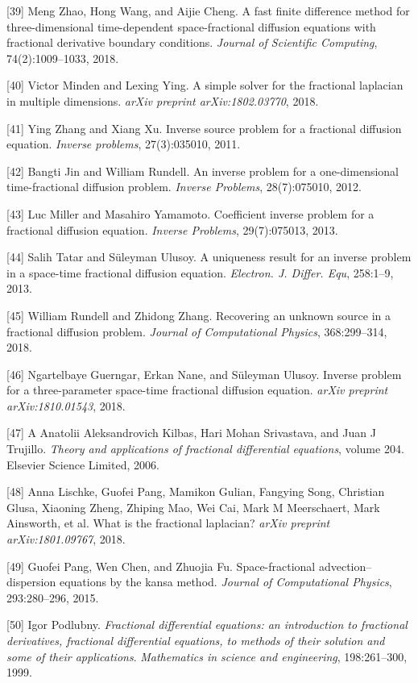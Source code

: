 \documentclass[UTF8]{article}
\begin{document}
[39] Meng Zhao, Hong Wang, and Aijie Cheng. A fast finite difference method for three-dimensional time-dependent space-fractional diffusion equations with fractional derivative boundary conditions. \textit{Journal of Scientific Computing}, 74(2):1009--1033, 2018.

[40] Victor Minden and Lexing Ying. A simple solver for the fractional laplacian in multiple dimensions. \textit{arXiv preprint arXiv:1802.03770}, 2018.

[41] Ying Zhang and Xiang Xu. Inverse source problem for a fractional diffusion equation. \textit{Inverse problems}, 27(3):035010, 2011.

[42] Bangti Jin and William Rundell. An inverse problem for a one-dimensional time-fractional diffusion problem. \textit{Inverse Problems}, 28(7):075010, 2012.

[43] Luc Miller and Masahiro Yamamoto. Coefficient inverse problem for a fractional diffusion equation. \textit{Inverse Problems}, 29(7):075013, 2013.

[44] Salih Tatar and Süleyman Ulusoy. A uniqueness result for an inverse problem in a space-time fractional diffusion equation. \textit{Electron. J. Differ. Equ}, 258:1--9, 2013.

[45] William Rundell and Zhidong Zhang. Recovering an unknown source in a fractional diffusion problem. \textit{Journal of Computational Physics}, 368:299--314, 2018.

[46] Ngartelbaye Guerngar, Erkan Nane, and Süleyman Ulusoy. Inverse problem for a three-parameter space-time fractional diffusion equation. \textit{arXiv preprint arXiv:1810.01543}, 2018.

[47] A Anatolii Aleksandrovich Kilbas, Hari Mohan Srivastava, and Juan J Trujillo. \textit{Theory and applications of fractional differential equations}, volume 204. Elsevier Science Limited, 2006.

[48] Anna Lischke, Guofei Pang, Mamikon Gulian, Fangying Song, Christian Glusa, Xiaoning Zheng, Zhiping Mao, Wei Cai, Mark M Meerschaert, Mark Ainsworth, et al. What is the fractional laplacian? \textit{arXiv preprint arXiv:1801.09767}, 2018.

[49] Guofei Pang, Wen Chen, and Zhuojia Fu. Space-fractional advection--dispersion equations by the kansa method. \textit{Journal of Computational Physics}, 293:280--296, 2015.

[50] Igor Podlubny. \textit{Fractional differential equations: an introduction to fractional derivatives, fractional differential equations, to methods of their solution and some of their applications}. \textit{Mathematics in science and engineering}, 198:261--300, 1999.
\end{document}
